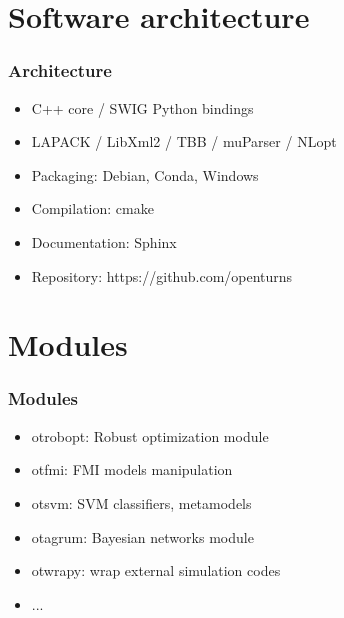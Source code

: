 \documentclass{beamer}
\begin{document}

\section{Software architecture}

\begin{frame}[containsverbatim]
\frametitle{Architecture}

\begin{itemize}
\item C++ core / SWIG Python bindings
\item LAPACK / LibXml2 / TBB / muParser / NLopt
\item Packaging: Debian, Conda, Windows
\item Compilation: cmake
\item Documentation: Sphinx
\item Repository: https://github.com/openturns
\end{itemize}

\end{frame}


\section{Modules}

\begin{frame}[containsverbatim]
\frametitle{Modules}

\begin{itemize}
\item otrobopt: Robust optimization module

\item otfmi: FMI models manipulation

\item otsvm: SVM classifiers, metamodels

\item otagrum: Bayesian networks module

\item otwrapy: wrap external simulation codes

\item ...
\end{itemize}

\end{frame}

\end{document}
